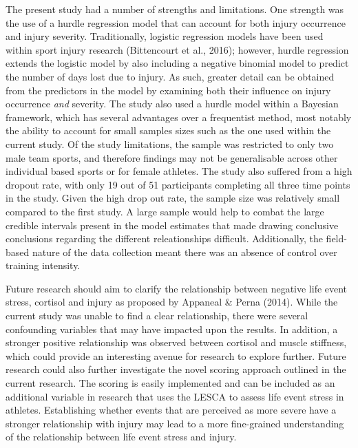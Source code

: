 \documentclass[
  english,
  man,floatsintext]{apa6}
\begin{document}
The present study had a number of strengths and limitations.
One strength was the use of a hurdle regression model that can account for both injury occurrence and injury severity.
Traditionally, logistic regression models have been used within sport injury research (Bittencourt et al., 2016); however, hurdle regression extends the logistic model by also including a negative binomial model to predict the number of days lost due to injury.
As such, greater detail can be obtained from the predictors in the model by examining both their influence on injury occurrence \emph{and} severity.
The study also used a hurdle model within a Bayesian framework, which has several advantages over a frequentist method, most notably the ability to account for small samples sizes such as the one used within the current study. Of the study limitations, the sample was restricted to only two male team sports, and therefore findings may not be generalisable across other individual based sports or for female athletes.
The study also suffered from a high dropout rate, with only 19 out of 51 participants completing all three time points in the study.
Given the high drop out rate, the sample size was relatively small compared to the first study.
A large sample would help to combat the large credible intervals present in the model estimates that made drawing conclusive conclusions regarding the different releationships difficult.
Additionally, the field-based nature of the data collection meant there was an absence of control over training intensity.

Future research should aim to clarify the relationship between negative life event stress, cortisol and injury as proposed by Appaneal \& Perna (2014).
While the current study was unable to find a clear relationship, there were several confounding variables that may have impacted upon the results.
In addition, a stronger positive relationship was observed between cortisol and muscle stiffness, which could provide an interesting avenue for research to explore further.
Future research could also further investigate the novel scoring approach outlined in the current research.
The scoring is easily implemented and can be included as an additional variable in research that uses the LESCA to assess life event stress in athletes.
Establishing whether events that are perceived as more severe have a stronger relationship with injury may lead to a more fine-grained understanding of the relationship between life event stress and injury.

\clearpage
\end{document}
